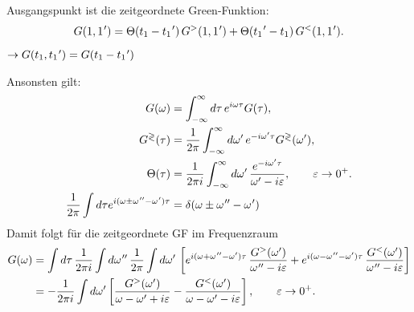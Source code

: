 
Ausgangspunkt ist die zeitgeordnete Green-Funktion:
\begin{equation}
  G(1,1\mkern1mu')=\Theta(t_1-t_1\mkern1mu')\,G^{>}(1,1\mkern1mu')+\Theta(t_1\mkern1mu'-t_1)\,G^{<}(1,1\mkern1mu').
\end{equation}
 $\rightarrow G(t_1,t_1\mkern1mu') = G(t_1-t_1\mkern1mu')$\\

Ansonsten gilt:
\begin{equation}
  \label{f:FormelFürFourier}
  \begin{aligned}
    G(\omega)                                                                          & = \int_{-\infty}^{\infty} d\tau\,e^{i\omega\tau}G(\tau),                                                                      \\
    G^{\gtrless}(\tau)                                                                 & = \frac{1}{2\pi}\int_{-\infty}^{\infty} d\omega'\,e^{-i\omega'\tau}G^{\gtrless}(\omega'),                                     \\
    \Theta(\tau)                                                                       & = \frac{1}{2\pi i}\int_{-\infty}^{\infty} d\omega'\,\frac{e^{-i\omega'\tau}}{\omega'-i\varepsilon},\qquad \varepsilon\to 0^+. \\
    \frac{1}{2\pi} \int d\tau e^{i(\omega \pm \omega\mkern1mu''-\omega\mkern1mu')\tau} & = \delta(\omega \pm \omega\mkern1mu''-\omega\mkern1mu')
  \end{aligned}
\end{equation}
Damit folgt für die zeitgeordnete GF im Frequenzraum
\begin{align}
  G(\omega)
   & = \int d\tau\,\frac{1}{2\pi i}\int d\omega\mkern1mu''\,\frac{1}{2\pi}\int d\omega'\,
  \left[
    e^{i(\omega+\omega\mkern1mu''-\omega')\tau}\,\frac{G^{>}(\omega')}{\omega\mkern1mu''-i\varepsilon}
    +e^{i(\omega-\omega\mkern1mu''-\omega')\tau}\,\frac{G^{<}(\omega')}{\omega\mkern1mu''-i\varepsilon}
    \right] \notag \\
   & = -\frac{1}{2\pi i}\int d\omega'\left[
                                       \frac{G^{>}(\omega')}{\omega-\omega'+i\varepsilon}
                                       -\frac{G^{<}(\omega')}{\omega-\omega'-i\varepsilon}
                                       \right],\qquad \varepsilon\to 0^+.
\end{align}

